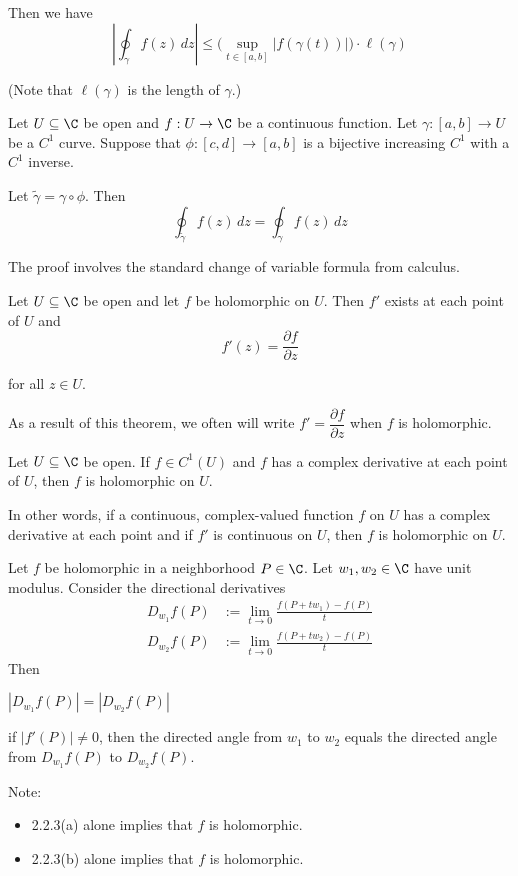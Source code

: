 Then we have
$$
	\left|\oint_\gamma f(z)\,dz\right|\leq
	\Big(\sup_{t\in[a,b]}|f(\gamma(t))|\Big)\cdot\ell(\gamma)
$$

(Note that $\ell(\gamma)$ is the length of $\gamma$.)

\label{f74efcb}

Let $U\subseteq\C$ be open and $f:U\to\C$ be a continuous function.
Let $\gamma:[a,b]\to U$ be a $C^1$ curve. Suppose that
$\phi:[c,d]\to[a,b]$ is a bijective increasing $C^1$ with a $C^1$
inverse.


Let $\tilde\gamma=\gamma\circ\phi$. Then
$$\oint_{\tilde\gamma}f(z)\,dz=\oint_\gamma f(z)\,dz$$

The proof involves the standard change of variable formula from
calculus.

\label{f75e43c}

Let $U\subseteq\C$ be open and let $f$ be holomorphic on $U$. Then
$f'$ exists at each point of $U$ and
$$f'(z)=\frac{\partial f}{\partial z}$$

for all $z\in U$.

As a result of this theorem, we often will write $f'=\dfrac{\partial
		f}{\partial z}$ when $f$ is holomorphic.

\label{d037b0f}

Let $U\subseteq\C$ be open. If $f\in C^1(U)$ and $f$ has a complex
derivative at each point of $U$, then $f$ is holomorphic on $U$.

In other words, if a continuous, complex-valued function $f$ on $U$ has
a complex derivative at each point and if $f'$ is continuous on $U$,
then $f$ is holomorphic on $U$.

\label{c41052e}

Let $f$ be holomorphic in a neighborhood $P\in\C$. Let $w_1,w_2\in\C$
have unit modulus. Consider the directional derivatives
\begin{align}
	D_{w_1}f(P) & :=\lim_{t\to0}\frac{f(P+tw_1)-f(P)}t \\
	D_{w_2}f(P) & :=\lim_{t\to0}\frac{f(P+tw_2)-f(P)}t
\end{align}
Then
\begin{enumerata}
	\item $|D_{w_1}f(P)|=|D_{w_2}f(P)|$
	\item if $|f'(P)|\neq0$, then the directed angle from $w_1$ to
	$w_2$ equals the directed angle from $D_{w_1}f(P)$ to $D_{w_2}f(P)$.
\end{enumerata}
Note:
\begin{itemize}
	\item 2.2.3(a) alone implies that $f$ is holomorphic.
	\item 2.2.3(b) alone implies that $f$ is holomorphic.
\end{itemize}

